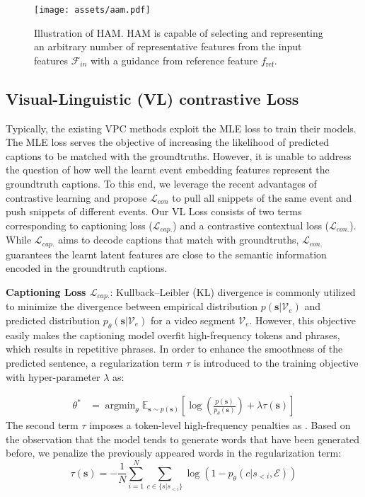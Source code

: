 \documentclass[letterpaper]{article} \usepackage{aaai23}  \usepackage{times}  \usepackage{helvet}  \usepackage{courier}  \usepackage[hyphens]{url}  \usepackage{graphicx} \urlstyle{rm} \def\UrlFont{\rm}  \usepackage{natbib}  \usepackage{caption} \frenchspacing  \setlength{\pdfpagewidth}{8.5in}  \setlength{\pdfpageheight}{11in}  \usepackage{algorithm}
\begin{document}
\begin{figure}[!t]
\centering
  \texttt{[image: assets/aam.pdf]}
  \caption{Illustration of HAM. HAM is capable of selecting and representing an arbitrary number of representative features from the input features $\mathcal{F}_{in}$ with a guidance from reference feature $f_{\text{ref}}$. }
\label{fig:AAM}
\end{figure}

\subsection{Visual-Linguistic (VL) contrastive Loss}
\label{sec:VL_loss}
Typically, the existing VPC methods exploit the MLE loss to train their models. The MLE loss serves the objective of increasing the likelihood of predicted captions to be matched with the groundtruths. However, it is unable to address the question of how well the learnt event embedding features represent the groundtruth captions. To this end, we leverage the recent advantages of contrastive learning \cite{wu2018unsupervised, chen2020simple} and propose $\mathcal{L}_{con}$ to pull all snippets of the same event and push snippets of different events. Our VL Loss consists of two terms corresponding to captioning loss ($\mathcal{L}_{cap.}$) and a contrastive contextual loss ($\mathcal{L}_{con.}$). While $\mathcal{L}_{cap.}$ aims to decode captions that match with groundtruths, $\mathcal{L}_{con.}$ guarantees the learnt latent features are close to the semantic information encoded in the groundtruth captions.

\noindent\textbf{Captioning Loss $\mathcal{L}_{cap.}$}:  
Kullback–Leibler (KL) divergence is commonly utilized
to minimize the divergence between empirical distribution $p(\mathbf{s}|\mathcal{V}_e)$ and 
predicted distribution $p_\theta(\mathbf{s}|\mathcal{V}_e)$ for a video segment $\mathcal{V}_e$. 
However, this objective easily makes the captioning model overfit high-frequency tokens and phrases, which results in repetitive phrases. In order to enhance the smoothness of the predicted sentence, a regularization term $\tau$ is introduced to the training objective with hyper-parameter $\lambda$ as:

\vspace{-2mm}
\begin{equation}
\begin{split}
     \theta^* 
     &= \mathop{\mathrm{argmin}}_\theta \mathbb{E}_{\mathbf{s}\sim  p(\mathbf{s})}\left[\log{\left(\frac{p(\mathbf{s})}{p_\theta(\mathbf{s})}\right)} + \lambda\tau(\mathbf{s})\right]
\end{split}
\end{equation}
The second term $\tau$ imposes a token-level high-frequency penalties as \cite{Song2021}. Based on the observation that the model tends to generate words that have been generated before, we penalize the previously appeared words in the regularization term:  
\begin{equation}
    \tau(\mathbf{s}) = -\frac{1}{N}\sum_{i=1}^N\sum_{c\in \{s | s_{<i}\}}\log{(1-p_\theta(c|s_{<i}, \mathcal{E}))}
\end{equation}
\end{document}
